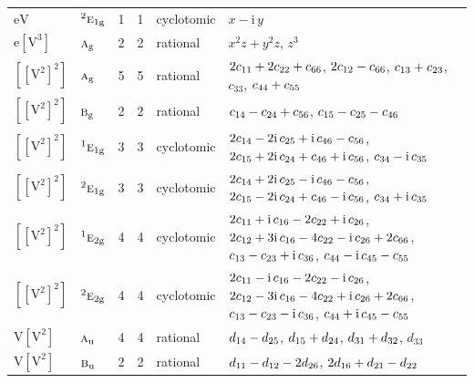 \documentclass[10pt,a4paper]{article}
\numberwithin{equation}{section}
\newcommand{\irr}[1]{\text{\normalfont\scshape #1}}
\newcommand{\conjpair}[1]{{}^{#1}}
\newcommand{\ptag}[1]{\mathrm{#1}}
\newcommand{\iunit}{\mathrm{i}}
\newcommand{\jahn}[1]{\mathrm{#1}}
\newlength{\fillwidth}\newlength{\cellwidth}\newlength{\colwidth}
\newcommand{\signbreak}{\penalty100\relax}
\begin{document}
{\begin{longtable}{@{}llrrl>{\RaggedRight\arraybackslash}p{\fillwidth}@{}}
$\jahn{eV}$ & $\conjpair{2}\irr{e}_{1\ptag{g}}$ & 1 & 1 & cyclotomic & $x - \iunit{}\,y$\\
$\jahn{e[V^{3}]}$ & $\irr{a}_{\ptag{g}}$ & 2 & 2 & rational & $x^{2}z + y^{2}z$, $z^{3}$\\
$\jahn{[[V^{2}]^{2}]}$ & $\irr{a}_{\ptag{g}}$ & 5 & 5 & rational & $2c_{11} +\signbreak 2c_{22} +\signbreak c_{66}$, $2c_{12} -\signbreak c_{66}$, $c_{13} +\signbreak c_{23}$, $c_{33}$, $c_{44} +\signbreak c_{55}$\\
$\jahn{[[V^{2}]^{2}]}$ & $\irr{b}_{\ptag{g}}$ & 2 & 2 & rational & $c_{14} -\signbreak c_{24} +\signbreak c_{56}$, $c_{15} -\signbreak c_{25} -\signbreak c_{46}$\\
$\jahn{[[V^{2}]^{2}]}$ & $\conjpair{1}\irr{e}_{1\ptag{g}}$ & 3 & 3 & cyclotomic & $2c_{14} -\signbreak 2\iunit{}\,c_{25} +\signbreak \iunit{}\,c_{46} -\signbreak c_{56}$, $2c_{15} +\signbreak 2\iunit{}\,c_{24} +\signbreak c_{46} +\signbreak \iunit{}\,c_{56}$, $c_{34} -\signbreak \iunit{}\,c_{35}$\\
$\jahn{[[V^{2}]^{2}]}$ & $\conjpair{2}\irr{e}_{1\ptag{g}}$ & 3 & 3 & cyclotomic & $2c_{14} +\signbreak 2\iunit{}\,c_{25} -\signbreak \iunit{}\,c_{46} -\signbreak c_{56}$, $2c_{15} -\signbreak 2\iunit{}\,c_{24} +\signbreak c_{46} -\signbreak \iunit{}\,c_{56}$, $c_{34} +\signbreak \iunit{}\,c_{35}$\\
$\jahn{[[V^{2}]^{2}]}$ & $\conjpair{1}\irr{e}_{2\ptag{g}}$ & 4 & 4 & cyclotomic & $2c_{11} +\signbreak \iunit{}\,c_{16} -\signbreak 2c_{22} +\signbreak \iunit{}\,c_{26}$, $2c_{12} +\signbreak 3\iunit{}\,c_{16} -\signbreak 4c_{22} -\signbreak \iunit{}\,c_{26} +\signbreak 2c_{66}$, $c_{13} -\signbreak c_{23} +\signbreak \iunit{}\,c_{36}$, $c_{44} -\signbreak \iunit{}\,c_{45} -\signbreak c_{55}$\\
$\jahn{[[V^{2}]^{2}]}$ & $\conjpair{2}\irr{e}_{2\ptag{g}}$ & 4 & 4 & cyclotomic & $2c_{11} -\signbreak \iunit{}\,c_{16} -\signbreak 2c_{22} -\signbreak \iunit{}\,c_{26}$, $2c_{12} -\signbreak 3\iunit{}\,c_{16} -\signbreak 4c_{22} +\signbreak \iunit{}\,c_{26} +\signbreak 2c_{66}$, $c_{13} -\signbreak c_{23} -\signbreak \iunit{}\,c_{36}$, $c_{44} +\signbreak \iunit{}\,c_{45} -\signbreak c_{55}$\\
$\jahn{V[V^{2}]}$ & $\irr{a}_{\ptag{u}}$ & 4 & 4 & rational & $d_{14} -\signbreak d_{25}$, $d_{15} +\signbreak d_{24}$, $d_{31} +\signbreak d_{32}$, $d_{33}$\\
$\jahn{V[V^{2}]}$ & $\irr{b}_{\ptag{u}}$ & 2 & 2 & rational & $d_{11} -\signbreak d_{12} -\signbreak 2d_{26}$, $2d_{16} +\signbreak d_{21} -\signbreak d_{22}$\\

\end{longtable}}
\end{document}
